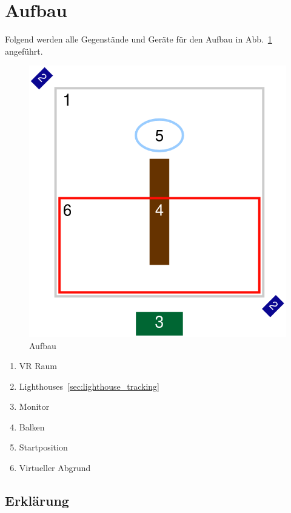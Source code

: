 
\section{Aufbau}
\label{sec:assembly}

Folgend werden alle Gegenstände und Geräte für den Aufbau in Abb.~\ref{fig:assembly} angeführt.

\begin{figure}
    \centering
    \includegraphics[scale=0.5]{pics/assemlbly}
    \caption{Aufbau}
    \label{fig:assembly}
\end{figure}

\begin{enumerate}
    \item VR Raum
    \item Lighthouses~\ref{sec:lighthouse_tracking}
    \item Monitor
    \item Balken
    \item Startposition
    \item Virtueller Abgrund
\end{enumerate}

\subsection{Erklärung}\label{subsec:description}

